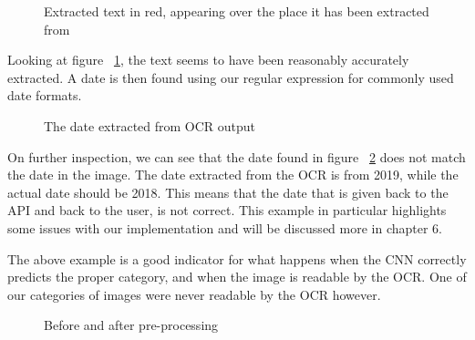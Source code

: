 \begin{figure}[h]
    \caption{Extracted text in red, appearing over the place it has been extracted from}
    \label{fig:ocrtextboxes}
\end{figure}
\clearpage
Looking at figure ~\ref{fig:ocrtextboxes}, the text seems to have been reasonably accurately extracted.
A date is then found using our regular expression for commonly used date formats.

\begin{figure}[h]
    \caption{The date extracted from OCR output}
    \label{fig:dateocr}
\end{figure}

On further inspection, we can see that the date found in figure \figurename{~\ref{fig:dateocr}} does not match the date in
the image.
The date extracted from the OCR is from 2019, while the actual date should be 2018.
This means that the date that is given back to the API and back to the user, is not correct.
This example in particular highlights some issues with our implementation and will be discussed more in chapter 6.

The above example is a good indicator for what happens when the CNN correctly predicts the proper category, and when the image is readable by the OCR\@.
One of our categories of images were never readable by the OCR however.

\begin{figure}[h]
    \caption{Before and after pre-processing}
    \label{fig:beforeafterflybuss}
\end{figure}

